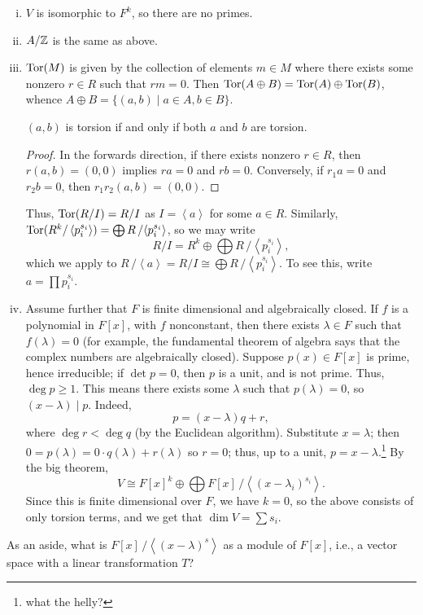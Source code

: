 \begin{enumerate}[(i)]
    \item $V$ is isomorphic to $F^k$, so there are no primes.
    \item $A/\mathbb Z$ is the same as above.
    \item $\operatorname{Tor}(M)$ is given by the collection of elements $m \in M$ where there exists some nonzero $r \in R$ such that $rm = 0$. Then $\operatorname{Tor}(A \oplus B) = \operatorname{Tor}(A) \oplus \operatorname{Tor}(B)$, whence $A \oplus B = \{(a, b) \mid a \in A, b \in B\}$.
    \begin{claim}
        $(a, b)$ is torsion if and only if both $a$ and $b$ are torsion.
    \end{claim}
    \begin{proof}
        In the forwards direction, if there exists nonzero $r \in R$, then $r(a, b) = (0, 0)$ implies $ra = 0$ and $rb = 0$. Conversely, if $r_1 a = 0$ and $r_2 b = 0$, then $r_1 r_2 (a, b) = (0, 0)$.
    \end{proof}
    Thus, $\operatorname{Tor}(R/I) = R/I$ as $I = \left<a\right>$ for some $a \in R$. Similarly, $\operatorname{Tor}(R^k / \left<p_i^{s_i}\right>) = \bigoplus R\,/\!\left<p_i^{s_i}\right>$, so we may write
    \[ R/I = R^k \oplus \bigoplus R\,/\!\left<p_i^{s_i}\right>, \]
    which we apply to $R\,/\!\left<a\right> = R/I \cong \bigoplus R\,/\!\left<p_i^{s_i}\right>$. To see this, write $a = \prod p_i^{s_i}$.
    \item Assume further that $F$ is finite dimensional and algebraically closed. If $f$ is a polynomial in $F[x]$, with $f$ nonconstant, then there exists $\lambda \in F$ such that $f(\lambda) = 0$ (for example, the fundamental theorem of algebra says that the complex numbers are algebraically closed). Suppose $p(x) \in F[x]$ is prime, hence irreducible; if $\det p = 0$, then $p$ is a unit, and is not prime. Thus, $\deg p \geq 1$. This means there exists some $\lambda$ such that $p(\lambda) = 0$, so $(x - \lambda) \mid p$. Indeed,
    \[ p = (x - \lambda) q + r, \]
    where $\deg r < \deg q$ (by the Euclidean algorithm). Substitute $x = \lambda$; then $0 = p(\lambda) = 0 \cdot q(\lambda) + r(\lambda)$ so $r = 0$; thus, up to a unit, $p = x - \lambda$.\footnote{what the helly?} By the big theorem,
    \[ V \cong F[x]^k \oplus \bigoplus F[x]\,/\!\left<(x - \lambda_i)^{s_i}\right>. \]
    Since this is finite dimensional over $F$, we have $k = 0$, so the above consists of only torsion terms, and we get that $\dim V = \sum s_i$.
\end{enumerate}
As an aside, what is $F[x]\,/\!\left<(x - \lambda)^s\right>$ as a module of $F[x]$, i.e., a vector space with a linear transformation $T$?
